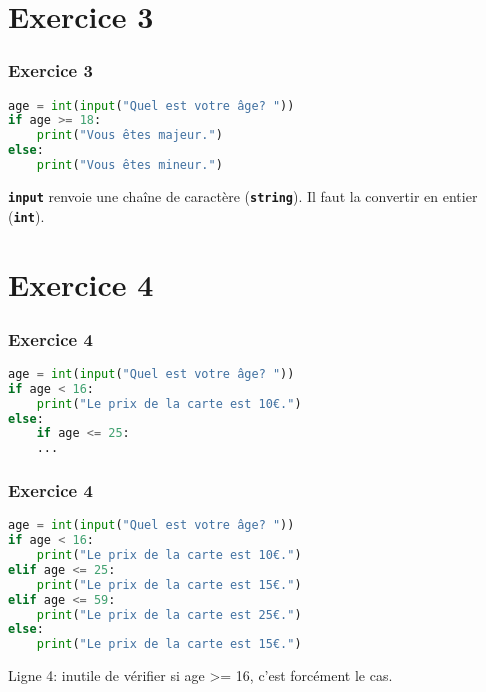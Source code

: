 \documentclass[svgnames,11pt]{beamer}
\begin{document}
\section{Exercice 3}
\begin{frame}[fragile]
    \frametitle{Exercice 3}

\begin{center}
\begin{lstlisting}[language=Python , basicstyle=\ttfamily\small, xleftmargin=1em, xrightmargin=1em]
age = int(input("Quel est votre âge? "))
if age >= 18:
    print("Vous êtes majeur.")
else:
    print("Vous êtes mineur.")
\end{lstlisting}
\label{CODE}
\end{center}
\begin{aretenir}[Remarque]
    \texttt{\textbf{input}} renvoie une chaîne de caractère (\texttt{\textbf{string}}).
    Il faut la convertir en entier (\texttt{\textbf{int}}).
\end{aretenir}
\end{frame}
\section{Exercice 4}
\begin{frame}[fragile]
    \frametitle{Exercice 4}

\begin{center}
\begin{lstlisting}[language=Python , basicstyle=\ttfamily\small, xleftmargin=1em, xrightmargin=1em]
age = int(input("Quel est votre âge? "))
if age < 16:
    print("Le prix de la carte est 10€.")
else:
    if age <= 25:
    ...
\end{lstlisting}
\label{CODE}
\end{center}   

\end{frame}
\begin{frame}[fragile]
    \frametitle{Exercice 4}

\begin{center}
\begin{lstlisting}[language=Python , basicstyle=\ttfamily\small, xleftmargin=1em, xrightmargin=1em]
age = int(input("Quel est votre âge? "))
if age < 16:
    print("Le prix de la carte est 10€.")
elif age <= 25:
    print("Le prix de la carte est 15€.")
elif age <= 59:
    print("Le prix de la carte est 25€.")
else:
    print("Le prix de la carte est 15€.")
\end{lstlisting}
\label{CODE}
\end{center}   
\begin{aretenir}[Remarque]
Ligne 4: inutile de vérifier si age >= 16, c'est
forcément le cas.
\end{aretenir}
\end{frame}
\end{document}
